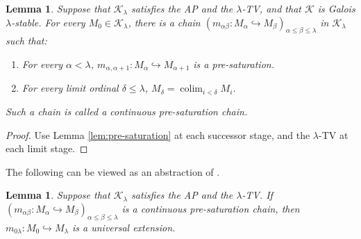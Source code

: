 \documentclass[10pt]{amsart}
\numberwithin{equation}{section}
\theoremstyle{plain}
\newtheorem{lemma}[theorem]{Lemma}
\theoremstyle{definition}
\DeclareMathOperator*{\colim}{colim}
\newcommand{\K}{\mathcal{K}}
\newcommand{\embed}{\hookrightarrow}
\begin{document}
\begin{lemma}
Suppose that $\K_\lambda$ satisfies the AP and the $\lambda$-TV, and that $\K$ is Galois $\lambda$-stable.
For every $M_0\in\K_\lambda$, there is a chain $(m_{\alpha\beta}\colon M_\alpha\embed M_\beta)_{\alpha\leq \beta\leq\lambda}$ in $\K_\lambda$ such that:
\begin{enumerate}
\item For every $\alpha<\lambda$, $m_{\alpha,\alpha+1}\colon M_\alpha\embed M_{\alpha+1}$ is a pre-saturation.
\item For every limit ordinal $\delta\leq\lambda$, $M_\delta=\colim_{i<\delta}M_i$.
\end{enumerate}

Such a chain is called a continuous pre-saturation chain.
\end{lemma}

\begin{proof}
Use Lemma \ref{lem:pre-saturation} at each successor stage, and the $\lambda$-TV at each limit stage.
\end{proof}




The following can be viewed as an abstraction of \cite[Lemma 10.5 (1)]{Bal09}.


\begin{lemma}
Suppose that $\K_\lambda$ satisfies the AP and the $\lambda$-TV.
If $(m_{\alpha\beta}\colon M_\alpha\embed M_\beta)_{\alpha\leq\beta\leq\lambda}$ is a continuous pre-saturation chain, then $m_{0\lambda}\colon M_0\embed M_\lambda$ is a universal extension.
\end{lemma}
\end{document}
